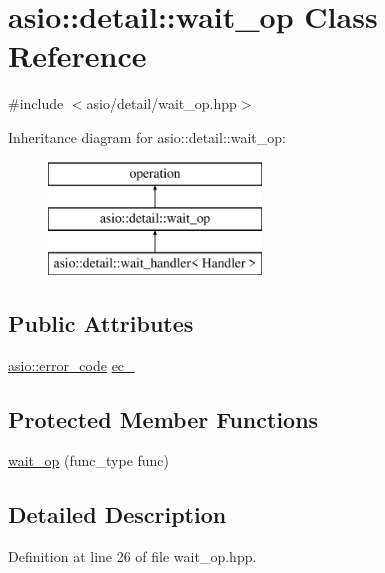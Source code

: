 \hypertarget{classasio_1_1detail_1_1wait__op}{}\section{asio\+:\+:detail\+:\+:wait\+\_\+op Class Reference}
\label{classasio_1_1detail_1_1wait__op}


{\ttfamily \#include $<$asio/detail/wait\+\_\+op.\+hpp$>$}

Inheritance diagram for asio\+:\+:detail\+:\+:wait\+\_\+op\+:\begin{figure}[H]
\begin{center}
\leavevmode
\includegraphics[height=3.000000cm]{classasio_1_1detail_1_1wait__op}
\end{center}
\end{figure}
\subsection*{Public Attributes}
\begin{DoxyCompactItemize}
\item 
\hyperlink{classasio_1_1error__code}{asio\+::error\+\_\+code} \hyperlink{classasio_1_1detail_1_1wait__op_a6f4814b62739333a69c3863f76e1b0d1}{ec\+\_\+}
\end{DoxyCompactItemize}
\subsection*{Protected Member Functions}
\begin{DoxyCompactItemize}
\item 
\hyperlink{classasio_1_1detail_1_1wait__op_a7418081bc1334183532fee12126d9ced}{wait\+\_\+op} (func\+\_\+type func)
\end{DoxyCompactItemize}


\subsection{Detailed Description}


Definition at line 26 of file wait\+\_\+op.\+hpp.



